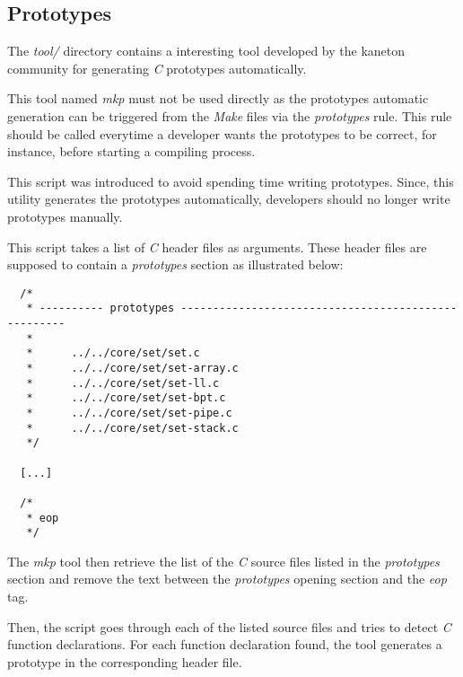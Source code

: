 %
%
%
%
%
%

%
%

\subsection{Prototypes}
\label{section:prototypes}

The \textit{tool/} directory contains a interesting tool developed by
the kaneton community for generating \textit{C} prototypes automatically.

This tool named \textit{mkp} must not be used directly as the prototypes
automatic generation can be triggered from the \textit{Make} files via the
\textit{prototypes} rule. This rule should be called everytime a developer
wants the prototypes to be correct, for instance, before starting a compiling
process.

This script was introduced to avoid spending time writing prototypes.
Since, this utility generates the prototypes automatically, developers
should no longer write prototypes manually.

This script takes a list of \textit{C} header files as arguments. These header
files are supposed to contain a \textit{prototypes} section as illustrated
below:

\begin{verbatim}
  /*
   * ---------- prototypes ----------------------------------------------------
   *
   *      ../../core/set/set.c
   *      ../../core/set/set-array.c
   *      ../../core/set/set-ll.c
   *      ../../core/set/set-bpt.c
   *      ../../core/set/set-pipe.c
   *      ../../core/set/set-stack.c
   */

  [...]

  /*
   * eop
   */
\end{verbatim}

The \textit{mkp} tool then retrieve the list of the \textit{C} source files
listed in the \textit{prototypes} section and remove the text between
the \textit{prototypes} opening section and the \textit{eop} tag.

Then, the script goes through each of the listed source files and tries to
detect \textit{C} function declarations. For each function declaration found,
the tool generates a prototype in the corresponding header file.

